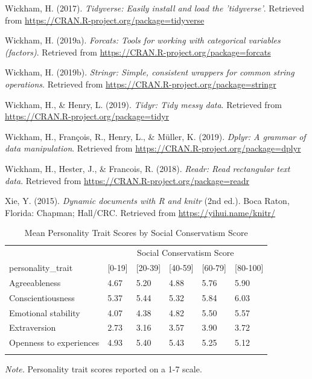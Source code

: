\documentclass[man]{apa6}
\begin{document}
\hypertarget{ref-R-tidyverse}{}
Wickham, H. (2017). \emph{Tidyverse: Easily install and load the
'tidyverse'}. Retrieved from
\url{https://CRAN.R-project.org/package=tidyverse}

\hypertarget{ref-R-forcats}{}
Wickham, H. (2019a). \emph{Forcats: Tools for working with categorical
variables (factors)}. Retrieved from
\url{https://CRAN.R-project.org/package=forcats}

\hypertarget{ref-R-stringr}{}
Wickham, H. (2019b). \emph{Stringr: Simple, consistent wrappers for
common string operations}. Retrieved from
\url{https://CRAN.R-project.org/package=stringr}

\hypertarget{ref-R-tidyr}{}
Wickham, H., \& Henry, L. (2019). \emph{Tidyr: Tidy messy data}.
Retrieved from \url{https://CRAN.R-project.org/package=tidyr}

\hypertarget{ref-R-dplyr}{}
Wickham, H., François, R., Henry, L., \& Müller, K. (2019). \emph{Dplyr:
A grammar of data manipulation}. Retrieved from
\url{https://CRAN.R-project.org/package=dplyr}

\hypertarget{ref-R-readr}{}
Wickham, H., Hester, J., \& Francois, R. (2018). \emph{Readr: Read
rectangular text data}. Retrieved from
\url{https://CRAN.R-project.org/package=readr}

\hypertarget{ref-R-knitr}{}
Xie, Y. (2015). \emph{Dynamic documents with R and knitr} (2nd ed.).
Boca Raton, Florida: Chapman; Hall/CRC. Retrieved from
\url{https://yihui.name/knitr/}

\begin{table}[tbp]
\begin{center}
\begin{threeparttable}
\caption{\label{tab:table1}Mean Personality Trait Scores by Social Conservatism Score}
\begin{tabular}{llllll}
\toprule
 & \multicolumn{5}{c}{Social Conservatism Score} \\
\cmidrule(r){2-6}
personality\_trait & \multicolumn{1}{c}{[0-19]} & \multicolumn{1}{c}{[20-39]} & \multicolumn{1}{c}{[40-59]} & \multicolumn{1}{c}{[60-79]} & \multicolumn{1}{c}{[80-100]}\\
\midrule
Agreeableness & 4.67 & 5.20 & 4.88 & 5.76 & 5.90\\
Conscientiousness & 5.37 & 5.44 & 5.32 & 5.84 & 6.03\\
Emotional stability & 4.07 & 4.38 & 4.82 & 5.50 & 5.57\\
Extraversion & 2.73 & 3.16 & 3.57 & 3.90 & 3.72\\
Openness to experiences & 4.93 & 5.40 & 5.43 & 5.25 & 5.12\\
\bottomrule
\addlinespace
\end{tabular}
\begin{tablenotes}[para]
\normalsize{\textit{Note.} Personality trait scores reported on a 1-7 scale.}
\end{tablenotes}
\end{threeparttable}
\end{center}
\end{table}
\end{document}

